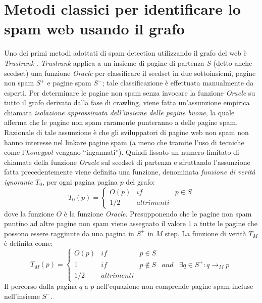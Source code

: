 \section{Metodi classici per identificare lo spam web usando il grafo}
Uno dei primi metodi adottati di spam detection utilizzando il grafo del web è \textit{Trustrank} \cite{Gyongyi:2004:CWS:1316689.1316740}. \textit{Trustrank} applica a un insieme di pagine di partenza \(S\) (detto anche seedset) una funzione \textit{Oracle} per classificare il seedset in due sottoinsiemi, pagine non spam \(S^+\) e pagine spam \(S^-\); tale classificazione è effettuata manualmente da esperti. Per determinare le pagine non spam senza invocare la funzione \textit{Oracle} su tutto il grafo derivato dalla fase di crawling, viene fatta un'assunzione empirica chiamata \textit{isolazione approssimata dell'insieme delle pagine buone}, la quale afferma che le pagine non spam raramente punteranno a delle pagine spam. Razionale di tale assunzione è che gli sviluppatori di pagine web non spam non hanno interesse nel linkare pagine spam (a meno che  tramite l'uso di tecniche come l'\textit{honeypot} vengano ``ingannati''). Quindi fissato un numero limitato di chiamate della funzione \textit{Oracle} sul 
seedset di partenza e sfruttando l'assunzione fatta precedentemente viene definita una funzione, denominata \textit{funzione di verità ignorante \(T_0\)}, per ogni pagina pagina \(p\) del grafo:
\begin{equation}
T_0(p)=\left\{
\begin{array}{ccc}
O(p) & if & p\in S \\
1/2 & altrimenti
\end{array}
\right .
\end{equation}
dove la funzione \(O\) è la funzione \textit{Oracle}. Presupponendo che le pagine non spam puntino ad altre pagine non spam viene assegnato il valore 1 a tutte le pagine che possono essere raggiunte da una pagina in \(S^+\) in \(M\) step. La funzione di verità \(T_M\) è definita come:
\begin{equation}
T_M(p)=\left\{
\begin{array}{ccccc}
O(p) & if & p\in S \\
1 & if & p \not\in S & and & \exists q\in S^+:q\rightarrow_M p \\
1/2 & altrimenti
\end{array}
\right .
\end{equation}
Il percorso  dalla pagina \(q\) a \(p\) nell'equazione non comprende pagine spam incluse nell'insieme \(S^-\).
